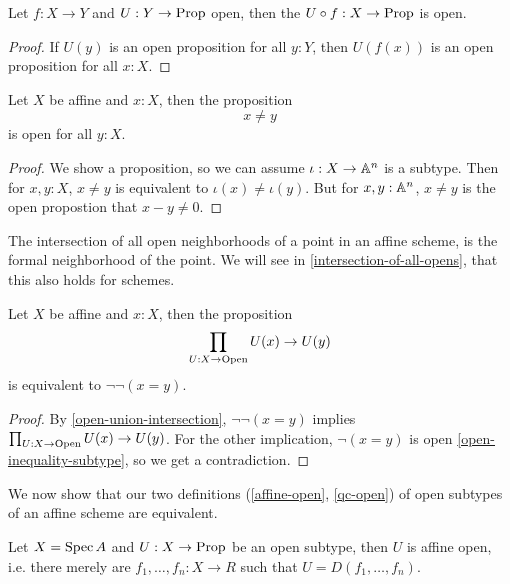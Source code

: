 \begin{lemma}%
  \label{preimage-open}
  Let $f:X\to Y$ and $U:Y\to\mathrm{Prop}$ open,
  then the  $U\circ f:X\to\mathrm{Prop}$ is open.
\end{lemma}

\begin{proof}
  If $U(y)$ is an open proposition for all $y : Y$,
  then $U(f(x))$ is an open proposition for all $x : X$.
\end{proof}

\begin{lemma}%
  \label{open-inequality-subtype}
  Let $X$ be affine and $x:X$, then the proposition
  \[ x\neq y \]
  is open for all $y:X$.
\end{lemma}

\begin{proof}
  We show a proposition, so we can assume $\iota: X\to \mathbb{A}^n$ is a subtype.
  Then for $x,y:X$, $x\neq y$ is equivalent to $\iota(x)\neq\iota(y)$.
  But for $x,y:\mathbb{A}^n$, $x\neq y$ is the open propostion that $x-y\neq 0$.
\end{proof}

The intersection of all open neighborhoods of a point in an affine scheme,
is the formal neighborhood of the point.
We will see in \cref{intersection-of-all-opens}, that this also holds for schemes.

\begin{lemma}%
  \label{affine-intersection-of-all-opens}
  Let $X$ be affine and $x:X$, then the proposition
  \[ \prod_{U:X\to \mathrm{Open}}U(x)\to U(y) \]
  is equivalent to $\neg\neg (x=y)$.
\end{lemma}

\begin{proof}
  By \cref{open-union-intersection}, $\neg\neg (x=y)$ implies $\prod_{U:X\to \mathrm{Open}}U(x)\to U(y)$.
  For the other implication,
  $\neg (x=y)$ is open \cref{open-inequality-subtype}, so we get a contradiction.
\end{proof}

We now show that our two definitions (\cref{affine-open}, \cref{qc-open})
of open subtypes of an affine scheme are equivalent.

\begin{theorem}%
  \label{qc-open-affine-open}
  Let $X=\operatorname{Spec} A$ and $U:X\to\mathrm{Prop}$ be an open subtype,
  then $U$ is affine open, i.e. there merely are $f_1,\dots,f_n:X\to R$ such that
  $U=D(f_1,\dots,f_n)$.
\end{theorem}

